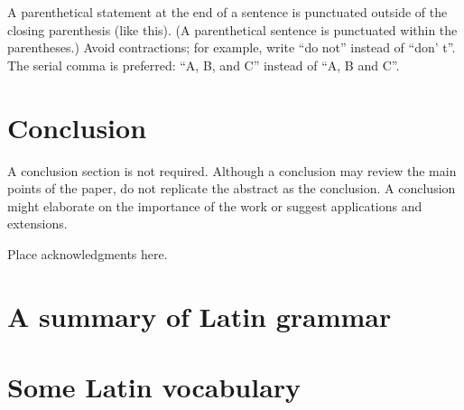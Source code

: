 \documentclass{ifacconf}
\begin{document}
A parenthetical statement at the end of a sentence is punctuated
outside of the closing parenthesis (like this). (A parenthetical
sentence is punctuated within the parentheses.) Avoid contractions;
for example, write ``do not'' instead of ``don' t''. The serial comma
is preferred: ``A, B, and C'' instead of ``A, B and C''.


\section{Conclusion}

A conclusion section is not required. Although a conclusion may review
the main points of the paper, do not replicate the abstract as the
conclusion. A conclusion might elaborate on the importance of the work
or suggest applications and extensions.

\begin{ack}
Place acknowledgments here.
\end{ack}

                                                   







\appendix
\section{A summary of Latin grammar}    %
\section{Some Latin vocabulary}              %
\end{document}
